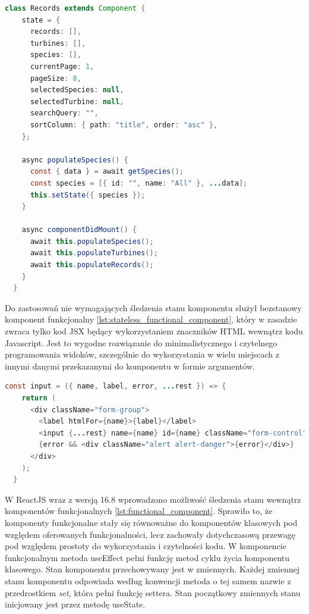 \documentclass{sprz}
\begin{document}
\begin{lstlisting}[language=Java,caption={Przykład komponentu klasowego}, label={lst:class_component}]
  class Records extends Component {
    state = {
      records: [],
      turbines: [],
      species: [],
      currentPage: 1,
      pageSize: 8,
      selectedSpecies: null,
      selectedTurbine: null,
      searchQuery: "",
      sortColumn: { path: "title", order: "asc" },
    };
  
    async populateSpecies() {
      const { data } = await getSpecies();
      const species = [{ id: "", name: "All" }, ...data];
      this.setState({ species });
    }

    async componentDidMount() {
      await this.populateSpecies();
      await this.populateTurbines();
      await this.populateRecords();
    }
  }
\end{lstlisting}

Do zastosowań nie wymagających śledzenia stanu komponentu służył bezstanowy komponent funkcjonalny \ref{lst:stateless_functional_component}, który w zasadzie zwraca tylko kod JSX będący wykorzystaniem znaczników HTML wewnątrz kodu Javascript. Jest to wygodne rozwiązanie do minimalistycznego i czytelnego programowania widoków, szczególnie do wykorzystania w wielu miejscach z innymi danymi przekazanymi do komponentu w formie argumentów.

\begin{lstlisting}[language=Java,caption={Przykład bezstanowego komponentu funkcjonalnego}, label={lst:stateless_functional_component}]
  const input = ({ name, label, error, ...rest }) => {
    return (
      <div className="form-group">
        <label htmlFor={name}>{label}</label>
        <input {...rest} name={name} id={name} className="form-control" />
        {error && <div className="alert alert-danger">{error}</div>}
      </div>
    );
  }
\end{lstlisting}

W ReactJS wraz z wersją 16.8 wprowadzono możliwość śledzenia stanu wewnątrz komponentów funkcjonalnych \ref{lst:functional_component}. Sprawiło to, że komponenty funkcjonalne stały się równoważne do komponentów klasowych pod względem oferowanych funkcjonalności, lecz zachowały dotychczasową przewagę pod względem prostoty do wykorzystania i czytelności kodu. W komponencie funkcjonalnym metoda useEffect pełni funkcję metod cyklu życia komponentu klasowego. Stan komponentu przechowywany jest w zmiennych. Każdej zmiennej stanu komponentu odpowiada według konwencji metoda o tej samem nazwie z przedrostkiem \textit{set}, która pełni funkcję settera. Stan początkowy zmiennych stanu inicjowany jest przez metodę useState.
\end{document}
